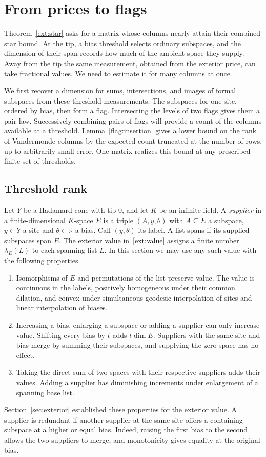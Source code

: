 \section{From prices to flags}\label{sec:flags}

Theorem~\ref{ext:star} asks for a matrix whose columns nearly attain
their combined star bound. At the tip, a bias threshold selects ordinary
subspaces, and the dimension of their span records how much of the
ambient space they supply. Away from the tip the same measurement,
obtained from the exterior price, can take fractional values. We need
to estimate it for many columns at once.

We first recover a dimension for sums, intersections, and images of
formal subspaces from these threshold measurements. The subspaces for
one site, ordered by bias, then form a flag. Intersecting the levels of
two flags gives them a pair law. Successively combining pairs of flags
will provide a count of the columns available at a threshold.
Lemma~\ref{flag:insertion} gives a lower bound on the rank of
Vandermonde columns by the expected count truncated at the number of
rows, up to arbitrarily small error. One matrix realizes this bound
at any prescribed finite set of thresholds.

\subsection{Threshold rank}

Let $Y$ be a Hadamard cone with tip $0$, and let $K$ be an infinite field.
A \emph{supplier} in a finite-dimensional $K$-space $E$ is a triple
$(A,y,\theta)$ with $A\subseteq E$ a subspace, $y\in Y$ a site and
$\theta\in\mathbb R$ a bias. Call $(y,\theta)$ its label. A list spans if
its supplied subspaces span $E$.
The exterior value in~\eqref{ext:value} assigns a finite number
$\lambda_E(L)$ to each spanning list $L$. In this section we may use
any such value with the following properties.
\begin{enumerate}
\item Isomorphisms of $E$ and permutations of the list preserve value.
The value is continuous in the labels, positively homogeneous under their
common dilation, and convex under simultaneous geodesic interpolation
of sites and linear interpolation of biases.
\item Increasing a bias, enlarging a subspace or adding a supplier can
only increase value. Shifting every bias by $t$ adds $t\dim E$.
Suppliers with the same site and bias merge by summing their subspaces,
and supplying the zero space has no effect.
\item Taking the direct sum of two spaces with their respective suppliers
adds their values. Adding a supplier has diminishing increments under
enlargement of a spanning base list.
\end{enumerate}
Section~\ref{sec:exterior} established these properties for the exterior
value. A supplier is redundant if another supplier at the same site
offers a containing subspace at a higher or equal bias. Indeed, raising
the first bias to the second allows the two suppliers to merge, and
monotonicity gives equality at the original bias.

